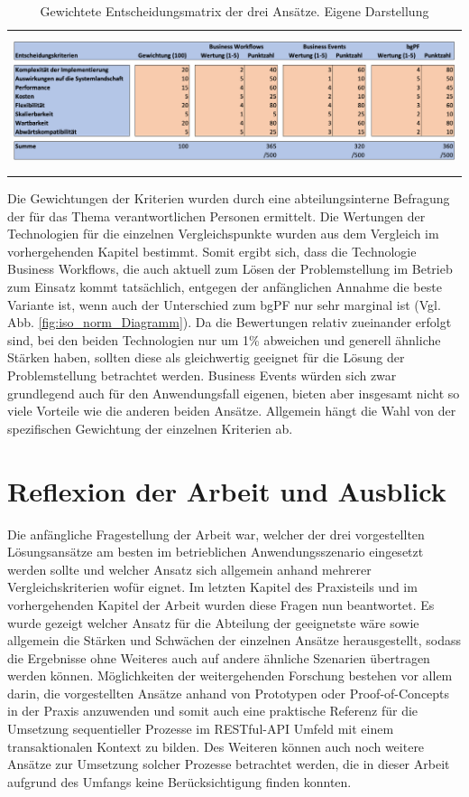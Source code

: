 \begin{table}[h]
    \centering
    \begin{tabular}{c}
        \includegraphics[height=4cm]{Bilder/Handlungsempfehlung_Entscheidungsmatrix.png}
    \end{tabular}
    \caption[Gewichtete Entscheidungsmatrix der drei Ansätze]{Gewichtete Entscheidungsmatrix der drei Ansätze. Eigene Darstellung}
    \label{tab:iso_norm_Entscheidungsmatrix}
\end{table}


Die Gewichtungen der Kriterien wurden durch eine abteilungsinterne Befragung der für das Thema verantwortlichen Personen ermittelt. Die Wertungen der Technologien für die einzelnen Vergleichspunkte wurden aus dem Vergleich im vorhergehenden Kapitel bestimmt. Somit ergibt sich, dass die Technologie Business Workflows, die auch aktuell zum Lösen der Problemstellung im Betrieb zum Einsatz kommt tatsächlich, entgegen der anfänglichen Annahme die beste Variante ist, wenn auch der Unterschied zum bgPF nur sehr marginal ist (Vgl. Abb. \ref{fig:iso_norm_Diagramm}). Da die Bewertungen relativ zueinander erfolgt sind, bei den beiden Technologien nur um 1\% abweichen und generell ähnliche Stärken haben, sollten diese als gleichwertig geeignet für die Lösung der Problemstellung betrachtet werden. Business Events würden sich zwar grundlegend auch für den Anwendungsfall eigenen, bieten aber insgesamt nicht so viele Vorteile wie die anderen beiden Ansätze. Allgemein hängt die Wahl von der spezifischen Gewichtung der einzelnen Kriterien ab. 

\section{Reflexion der Arbeit und Ausblick}

Die anfängliche Fragestellung der Arbeit war, welcher der drei vorgestellten Lösungsansätze am besten im betrieblichen Anwendungsszenario eingesetzt werden sollte und welcher Ansatz sich allgemein anhand mehrerer Vergleichskriterien wofür eignet. Im letzten Kapitel des Praxisteils und im vorhergehenden Kapitel der Arbeit wurden diese Fragen nun beantwortet. Es wurde gezeigt welcher Ansatz für die Abteilung der geeignetste wäre sowie allgemein die Stärken und Schwächen der einzelnen Ansätze herausgestellt, sodass die Ergebnisse ohne Weiteres auch auf andere ähnliche Szenarien übertragen werden können. Möglichkeiten der weitergehenden Forschung bestehen vor allem darin, die vorgestellten Ansätze anhand von Prototypen oder Proof-of-Concepts in der Praxis anzuwenden und somit auch eine praktische Referenz für die Umsetzung sequentieller Prozesse im RESTful-API Umfeld mit einem transaktionalen Kontext zu bilden. Des Weiteren können auch noch weitere Ansätze zur Umsetzung solcher Prozesse betrachtet werden, die in dieser Arbeit aufgrund des Umfangs keine Berücksichtigung finden konnten.